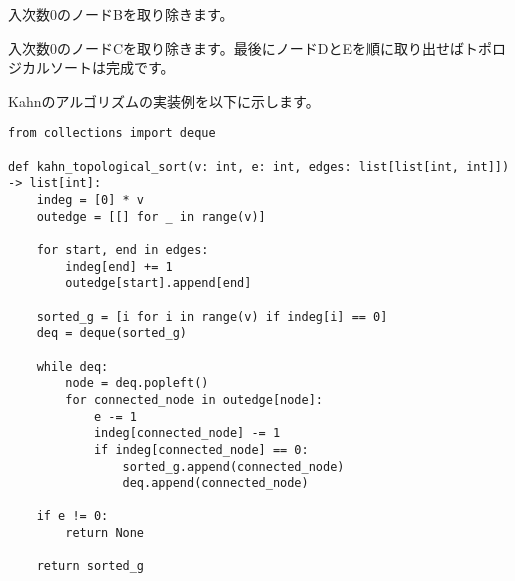 \vspace{0.5cm}

入次数0のノードBを取り除きます。


\vspace{0.5cm}

\begin{center}
\end{center}

\vspace{0.5cm}

入次数0のノードCを取り除きます。最後にノードDとEを順に取り出せばトポロジカルソートは完成です。


\vspace{0.5cm}

\begin{center}
\end{center}

\vspace{0.5cm}

Kahnのアルゴリズムの実装例を以下に示します。
\begin{lstlisting}[caption=Kahnのアルゴリズムの実装, label=kahn, frame=TRBL, label={kahn}]
from collections import deque

def kahn_topological_sort(v: int, e: int, edges: list[list[int, int]]) -> list[int]:
    indeg = [0] * v
    outedge = [[] for _ in range(v)]
    
    for start, end in edges:
        indeg[end] += 1
        outedge[start].append[end]
    
    sorted_g = [i for i in range(v) if indeg[i] == 0]
    deq = deque(sorted_g)
    
    while deq:
        node = deq.popleft()
        for connected_node in outedge[node]:
            e -= 1
            indeg[connected_node] -= 1
            if indeg[connected_node] == 0: 
                sorted_g.append(connected_node)
                deq.append(connected_node)
    
    if e != 0:
        return None
    
    return sorted_g
\end{lstlisting}

